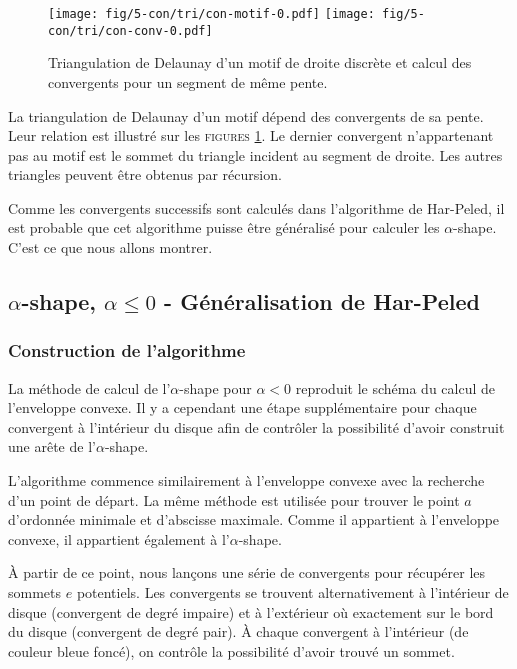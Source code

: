 \begin{figure}[H]
  \centering
  \texttt{[image: fig/5-con/tri/con-motif-0.pdf]}
  \texttt{[image: fig/5-con/tri/con-conv-0.pdf]}
  \caption{Triangulation de Delaunay d'un motif de droite discrète et calcul des convergents pour un segment de même pente.}
\label{fig:tri}   
\end{figure}

La triangulation de Delaunay d'un motif dépend des convergents de sa pente. Leur relation est illustré sur les \textsc{figures} \ref{fig:tri}. Le dernier convergent n'appartenant pas au motif est le sommet du triangle incident au segment de droite. Les autres triangles peuvent être obtenus par récursion. 

Comme les convergents successifs sont calculés dans l’algorithme de Har-Peled, il est probable que cet algorithme puisse être généralisé pour calculer les $\alpha$-shape. C'est ce que nous allons montrer.  

\subsection{$\alpha$-shape, $\alpha \leq 0$ - Généralisation de Har-Peled}

\subsubsection{Construction de l'algorithme}

La méthode de calcul de l'$\alpha$-shape pour $\alpha <0$ reproduit le schéma du calcul de l’enveloppe convexe. Il y a cependant une étape supplémentaire pour chaque convergent à l'intérieur du disque afin de contrôler la possibilité d'avoir construit une arête de l'$\alpha$-shape.

L'algorithme commence similairement à l'enveloppe convexe avec la recherche d'un point de départ. La même méthode est utilisée pour trouver le point $a$ d'ordonnée minimale et d'abscisse maximale. Comme il appartient à l'enveloppe convexe, il appartient également à l'$\alpha$-shape.

À partir de ce point, nous lançons une série de convergents pour récupérer les sommets $e$ potentiels. Les convergents se trouvent alternativement à l'intérieur de disque (convergent de degré impaire) et à l'extérieur où exactement sur le bord du disque (convergent de degré pair). À chaque convergent à l'intérieur (de couleur bleue foncé), on contrôle la possibilité d'avoir trouvé un sommet.

